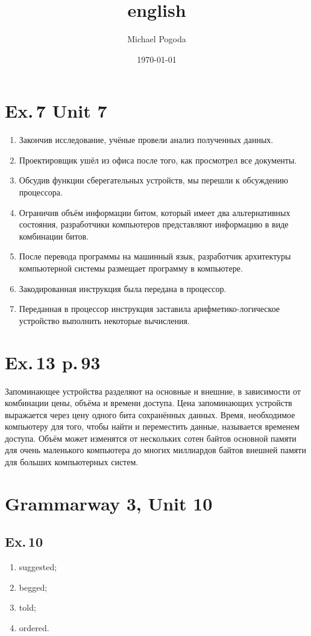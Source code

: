 \documentclass[a4paper,10pt,notitlepage,pdftex,headsepline]{scrartcl}
\author{Michael Pogoda}
\title{english}
\date{\today}
\begin{document}
\section{Ex.\,7 Unit 7}
\begin{enumerate}
\item Закончив исследование, учёные провели анализ полученных данных.
\item Проектировщик ушёл из офиса после того, как просмотрел все документы.
\item Обсудив функции сберегательных устройств, мы перешли к обсуждению процессора.
\item Ограничив объём информации битом, который имеет два альтернативных состояния, разработчики компьютеров представляют информацию в виде комбинации битов.
\item После перевода программы на машинный язык, разработчик архитектуры компьютерной системы размещает программу в компьютере.
\item Закодированная инструкция была передана в процессор.
\item Переданная в процессор инструкция заставила арифметико-логическое устройство выполнить некоторые вычисления.
\end{enumerate}
\section{Ex.\,13 p.\,93}
Запоминающее устройства разделяют на основные и внешние, в зависимости от комбинации цены, объёма и времени доступа.
Цена запоминающих устройств выражается через цену одного бита сохранённых данных.
Время, необходимое компьютеру для того, чтобы найти и переместить данные, называется временем доступа.
Объём может изменятся от нескольких сотен байтов основной памяти для очень маленького компьютера до многих миллиардов байтов внешней памяти для больших компьютерных систем.
\section{Grammarway 3, Unit 10}
\subsection{Ex.\,10}
\begin{enumerate}
\item suggested;
\item begged;
\item told;
\item ordered.
\end{enumerate}
\end{document}
